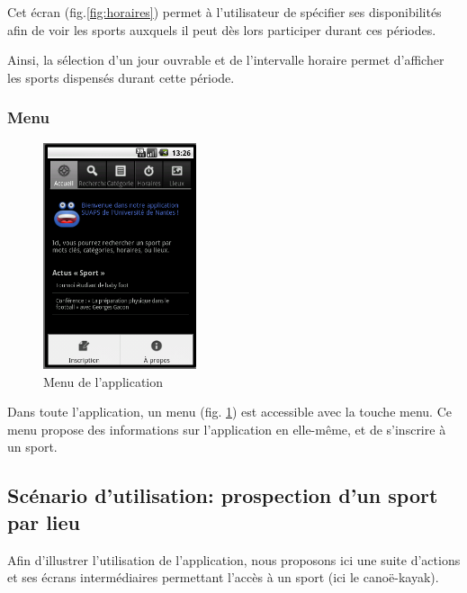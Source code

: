\documentclass[french, titlepage, 11pt, a4paper]{article}
\begin{document}
		Cet écran (fig.\ref{fig:horaires}) permet à l'utilisateur de spécifier ses
		disponibilités afin de voir les sports auxquels il peut dès lors participer
		durant ces périodes.

		Ainsi, la sélection d'un jour ouvrable et de l'intervalle horaire permet
		d'afficher les sports dispensés durant cette période.

		\subsubsection{Menu}

		    \begin{figure}[htb]
		        \centering
		        \includegraphics[width=0.4\textwidth]{menu.png}
		        \caption{Menu de l'application}
		        \label{fig:menu}
		    \end{figure}

		    Dans toute l'application, un menu (fig. \ref{fig:menu}) est accessible avec la touche \og
		    menu\fg{}. Ce menu propose des informations sur l'application en
		    elle-même, et de s'inscrire à un sport.

	\subsection{Scénario d'utilisation: prospection d'un sport par lieu}

	Afin d'illustrer l'utilisation de l'application, nous proposons ici une suite
	d'actions et ses écrans intermédiaires permettant l'accès à un sport (ici le
	canoë-kayak).
\end{document}
